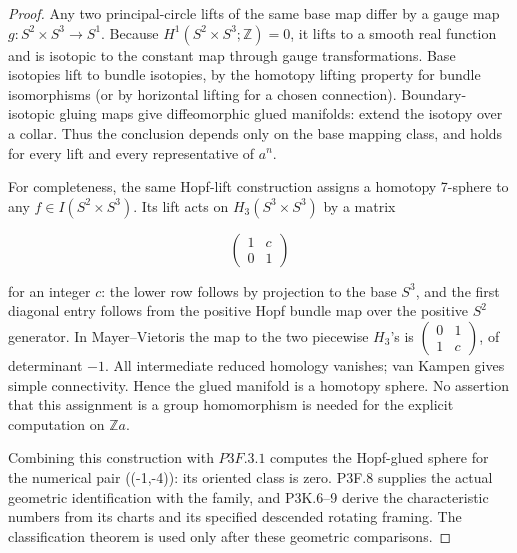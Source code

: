 \begin{proof}
Any two principal-circle lifts of the same base map differ by a gauge map \(g:S^2\times S^3\to S^1\). Because \(H^1(S^2\times S^3;\mathbb Z)=0\), it lifts to a smooth real function and is isotopic to the constant map through gauge transformations. Base isotopies lift to bundle isotopies, by the homotopy lifting property for bundle isomorphisms (or by horizontal lifting for a chosen connection). Boundary-isotopic gluing maps give diffeomorphic glued manifolds: extend the isotopy over a collar. Thus the conclusion depends only on the base mapping class, and holds for every lift and every representative of \(a^n\).

For completeness, the same Hopf-lift construction assigns a homotopy 7-sphere to any \(f\in I(S^2\times S^3)\). Its lift acts on \(H_3(S^3\times S^3)\) by a matrix

\[
 \begin{pmatrix}1&c\\0&1\end{pmatrix}
\]

for an integer \(c\): the lower row follows by projection to the base \(S^3\), and the first diagonal entry follows from the positive Hopf bundle map over the positive \(S^2\) generator. In Mayer--Vietoris the map to the two piecewise \(H_3\)'s is \(\left(\begin{smallmatrix}0&1\\1&c\end{smallmatrix}\right)\), of determinant \(-1\). All intermediate reduced homology vanishes; van Kampen gives simple connectivity. Hence the glued manifold is a homotopy sphere. No assertion that this assignment is a group homomorphism is needed for the explicit computation on \(\mathbb Za\).

Combining this construction with \(P3F.3.1\) computes the Hopf-glued sphere for the numerical pair ((-1,-4)): its oriented class is zero. P3F.8 supplies the actual geometric identification with the family, and P3K.6--9 derive the characteristic numbers from its charts and its specified descended rotating framing. The classification theorem is used only after these geometric comparisons.
\end{proof}

